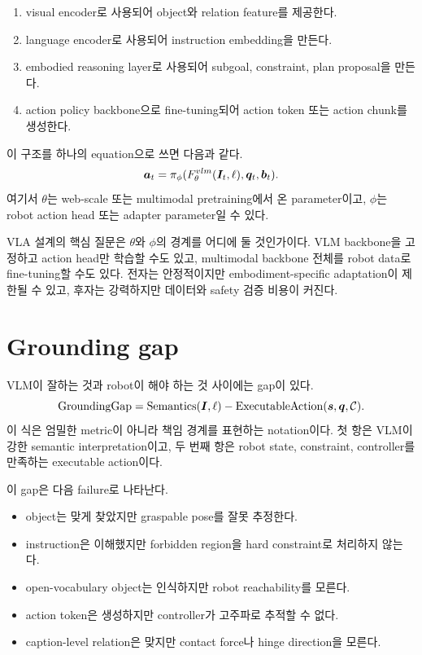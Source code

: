 \begin{enumerate}
  \item visual encoder로 사용되어 object와 relation feature를 제공한다.
  \item language encoder로 사용되어 instruction embedding을 만든다.
  \item embodied reasoning layer로 사용되어 subgoal, constraint, plan proposal을 만든다.
  \item action policy backbone으로 fine-tuning되어 action token 또는 action chunk를 생성한다.
\end{enumerate}

이 구조를 하나의 equation으로 쓰면 다음과 같다.
\begin{equation}
  \bm{a}_t
  =
  \pi_{\phi}
  (
  F_{\theta}^{vlm}(\bm{I}_t,\ell),
  \bm{q}_t,
  \bm{b}_t
  ).
  \label{eq:vlm-prior-policy}
\end{equation}
여기서 $\theta$는 web-scale 또는 multimodal pretraining에서 온 parameter이고, $\phi$는 robot action head 또는 adapter parameter일 수 있다.

VLA 설계의 핵심 질문은 $\theta$와 $\phi$의 경계를 어디에 둘 것인가이다. VLM backbone을 고정하고 action head만 학습할 수도 있고, multimodal backbone 전체를 robot data로 fine-tuning할 수도 있다. 전자는 안정적이지만 embodiment-specific adaptation이 제한될 수 있고, 후자는 강력하지만 데이터와 safety 검증 비용이 커진다.

\section{Grounding gap}

VLM이 잘하는 것과 robot이 해야 하는 것 사이에는 gap이 있다.
\begin{equation}
  \mathrm{GroundingGap}
  =
  \mathrm{Semantics}(\bm{I},\ell)
  -
  \mathrm{ExecutableAction}(\bm{s},\bm{q},\mathcal{C}).
  \label{eq:grounding-gap}
\end{equation}
이 식은 엄밀한 metric이 아니라 책임 경계를 표현하는 notation이다. 첫 항은 VLM이 강한 semantic interpretation이고, 두 번째 항은 robot state, constraint, controller를 만족하는 executable action이다.

이 gap은 다음 failure로 나타난다.

\begin{itemize}
  \item object는 맞게 찾았지만 graspable pose를 잘못 추정한다.
  \item instruction은 이해했지만 forbidden region을 hard constraint로 처리하지 않는다.
  \item open-vocabulary object는 인식하지만 robot reachability를 모른다.
  \item action token은 생성하지만 controller가 고주파로 추적할 수 없다.
  \item caption-level relation은 맞지만 contact force나 hinge direction을 모른다.
\end{itemize}

